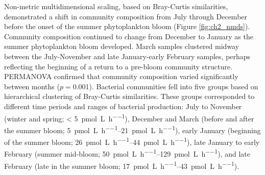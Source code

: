 Non-metric multidimensional scaling, based on Bray-Curtis similarities, demonstrated a shift in community composition from July through December before the onset of the summer phytoplankton bloom (Figure \ref{fig:ch2_nmds}). Community composition continued to change from December to January as the summer phytoplankton bloom developed. March samples clustered midway between the July-November and late January-early February samples, perhaps reflecting the beginning of a return to a pre-bloom community structure. PERMANOVA confirmed that community composition varied significantly between months ($p=0.$001). Bacterial communities fell into five groups based on hierarchical clustering of Bray-Curtis similarities. These groups corresponded to different time periods and ranges of bacterial production: July to November (winter and spring; \textless{} \SI{5}{\pico\mole \per\liter \per\hour}), December and March (before and after the summer bloom; \SIrange{5}{21}{\pico\mole \per\liter \per\hour}), early January (beginning of the summer bloom; \SIrange{26}{44}{\pico\mole \per\liter \per\hour}), late January to early February (summer mid-bloom; \SIrange{50}{129}{\pico\mole \per\liter \per\hour}), and late February (late in the summer bloom; \SIrange{17}{43}{\pico\mole \per\liter \per\hour}).

